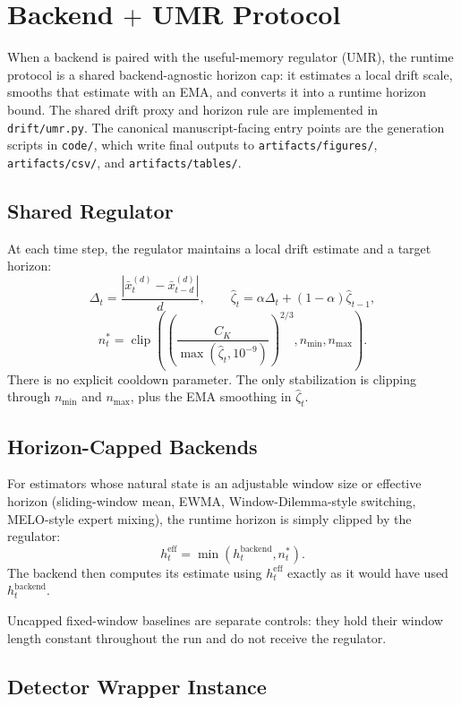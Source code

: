 \section{Backend $+$ UMR Protocol}\label{app:backend_umr_protocol}

When a backend is paired with the useful-memory regulator (UMR), the runtime
protocol is a shared backend-agnostic horizon cap: it estimates a local drift
scale, smooths that estimate with an EMA, and converts it into a runtime
horizon bound. The shared drift proxy and horizon rule are implemented in
\texttt{drift/umr.py}. The canonical manuscript-facing entry points are the
generation scripts in \texttt{code/}, which write final outputs to
\texttt{artifacts/figures/}, \texttt{artifacts/csv/}, and
\texttt{artifacts/tables/}.

\subsection{Shared Regulator}

At each time step, the regulator maintains a local drift estimate and a target
horizon:
\[
  \Delta_t = \frac{|\bar x_t^{(d)} - \bar x_{t-d}^{(d)}|}{d},
  \qquad
  \hat\zeta_t = \alpha\Delta_t + (1-\alpha)\hat\zeta_{t-1},
\]
\[
  n_t^* = \operatorname{clip}\!\left(
    \left(\frac{C_K}{\max(\hat\zeta_t,10^{-9})}\right)^{2/3},
    n_{\min}, n_{\max}
  \right).
\]
There is no explicit cooldown parameter. The only stabilization is clipping
through $n_{\min}$ and $n_{\max}$, plus the EMA smoothing in $\hat\zeta_t$.

\subsection{Horizon-Capped Backends}

For estimators whose natural state is an adjustable window size or effective
horizon (sliding-window mean, EWMA, Window-Dilemma-style switching,
MELO-style expert mixing), the runtime horizon is simply clipped by the
regulator:
\[
  h_t^{\mathrm{eff}} = \min(h_t^{\mathrm{backend}}, n_t^*).
\]
The backend then computes its estimate using $h_t^{\mathrm{eff}}$ exactly as it
would have used $h_t^{\mathrm{backend}}$.

Uncapped fixed-window baselines are separate controls: they hold their window
length constant throughout the run and do not receive the regulator.

\subsection{Detector Wrapper Instance}


